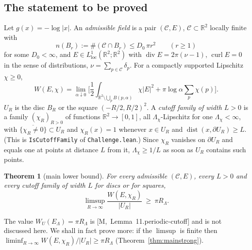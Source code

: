 \documentclass[11pt,reqno]{amsart}
\numberwithin{equation}{section}
\theoremstyle{plain}
\newtheorem{theorem}{Theorem}[section]
\theoremstyle{definition}
\newcommand{\R}{\mathbb{R}}
\newcommand{\Lam}{\Lambda}
\newcommand{\dist}{\operatorname{dist}}
\newcommand{\dvg}{\operatorname{div}}
\newcommand{\curl}{\operatorname{curl}}
\newcommand{\ms}[1]{\textup{[M,~#1]}}
\begin{document}
\subsection{The statement to be proved}
Let $g(x)=-\log|x|$.  An \emph{admissible field} is a pair $(\mathcal C,E)$, $\mathcal C\subset\R^2$ locally finite with
\begin{equation}\label{eq:density}
n(B_r):=\#(\mathcal C\cap B_r)\le D_0\,\pi r^2\qquad(r\ge1)
\end{equation}
for some $D_0<\infty$, and $E\in L^1_{\mathrm{loc}}(\R^2;\R^2)$ with $\dvg E=2\pi(\nu-1)$, $\curl E=0$ in the sense of distributions, $\nu=\sum_{p\in\mathcal C}\delta_p$.  For a compactly supported Lipschitz $\chi\ge0$,
\begin{equation}\label{eq:Wchi}
W(E,\chi)=\lim_{\alpha\downarrow0}\Big[\frac12\int_{\R^2\setminus\bigcup_pB(p,\alpha)}\chi|E|^2+\pi\log\alpha\sum_p\chi(p)\Big].
\end{equation}
$U_R$ is the disc $B_R$ or the square $(-R/2,R/2)^2$.  A \emph{cutoff family of width $L>0$} is a family $(\chi_R)_{R>0}$ of functions $\R^2\to[0,1]$, all $\Lambda_\chi$-Lipschitz for one $\Lambda_\chi<\infty$, with $\overline{\{\chi_R\ne0\}}\subset U_R$ and $\chi_R(x)=1$ whenever $x\in U_R$ and $\dist(x,\partial U_R)\ge L$.  (This is \texttt{IsCutoffFamily} of \texttt{Challenge.lean}.)  Since $\chi_R$ vanishes on $\partial U_R$ and equals one at points at distance $L$ from it, $\Lambda_\chi\ge1/L$ as soon as $U_R$ contains such points.

\begin{theorem}[main lower bound]\label{thm:main}
For every admissible $(\mathcal C,E)$, every $L>0$ and every cutoff family of width $L$ for discs or for squares,
\[
\limsup_{R\to\infty}\frac{W(E,\chi_R)}{|U_R|}\ \ge\ \pi R_\Lam .
\]
\end{theorem}

The value $W_U(E_\Lam)=\pi R_\Lam$ is \ms{Lemma~11.periodic-cutoff} and is not discussed here.  We shall in fact prove more: if the $\limsup$ is finite then $\liminf_{R\to\infty}W(E,\chi_R)/|U_R|\ge\pi R_\Lam$ (Theorem~\ref{thm:mainstrong}).
\end{document}
